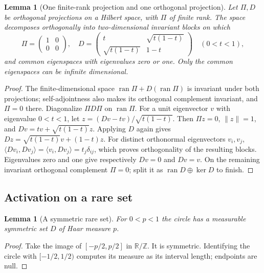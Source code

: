 \documentclass[reqno,a4paper,12pt]{amsart}
\newtheorem{lemma}[theorem]{Lemma}
\theoremstyle{definition}
\newcommand{\R}{\mathbb R}
\newcommand{\Z}{\mathbb Z}
\newcommand{\ip}[2]{\langle #1,#2\rangle}
\newcommand{\ran}{\operatorname{ran}}
\begin{document}
\begin{lemma}[One finite-rank projection and one orthogonal projection]
\label{lem:two-projections}
Let $\Pi,D$ be orthogonal projections on a Hilbert space, with $\Pi$
of finite rank. The space decomposes orthogonally into two-dimensional
invariant blocks on which
\[
 \Pi=\begin{pmatrix}1&0\\0&0\end{pmatrix},\quad
 D=\begin{pmatrix}t&\sqrt{t(1-t)}\\
 \sqrt{t(1-t)}&1-t\end{pmatrix}\quad(0<t<1),
\]
and common eigenspaces with eigenvalues zero or one.
Only the common eigenspaces can be infinite dimensional.
\end{lemma}
\begin{proof}
The finite-dimensional space $\ran\Pi+D(\ran\Pi)$ is invariant under
both projections; self-adjointness also makes its orthogonal complement
invariant, and $\Pi=0$ there. Diagonalize $\Pi D\Pi$ on $\ran\Pi$.
For a unit eigenvector $v$ with eigenvalue $0<t<1$, let
$z=(Dv-tv)/\sqrt{t(1-t)}$. Then
$\Pi z=0$, $\|z\|=1$, and
$Dv=tv+\sqrt{t(1-t)}z$.
Applying $D$ again gives
$Dz=\sqrt{t(1-t)}v+(1-t)z$.
For distinct orthonormal eigenvectors $v_i,v_j$,
$\ip{Dv_i}{Dv_j}=\ip{v_i}{Dv_j}=t_j\delta_{ij}$,
which proves orthogonality of the resulting blocks.
Eigenvalues zero and one give respectively $Dv=0$ and $Dv=v$.
On the remaining invariant orthogonal complement $\Pi=0$; split it
as $\ran D\oplus\ker D$ to finish.
\end{proof}

\subsection{Activation on a rare set}
\begin{lemma}[A symmetric rare set]\label{lem:rare-set}
For $0<p<1$ the circle has a measurable symmetric set $D$ of Haar
measure $p$.
\end{lemma}
\begin{proof}
Take the image of $[-p/2,p/2]$ in $\R/\Z$. It is symmetric.
Identifying the circle with $[-1/2,1/2)$ computes its measure as its
interval length; endpoints are null.
\end{proof}
\end{document}
